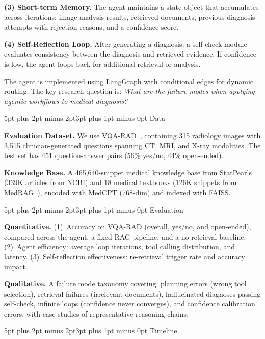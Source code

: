 \documentclass[10pt,twocolumn,letterpaper]{article}
\makeatletter
\renewcommand\section{\@startsection{section}{1}{\z@}%
  {5pt plus 2pt minus 2pt}{3pt plus 1pt minus 0pt}%
  {\large\bfseries}}
\makeatother
\begin{document}
\textbf{(3) Short-term Memory.} The agent maintains a state object that accumulates across iterations: image analysis results, retrieved documents, previous diagnosis attempts with rejection reasons, and a confidence score.

\textbf{(4) Self-Reflection Loop.} After generating a diagnosis, a self-check module evaluates consistency between the diagnosis and retrieved evidence. If confidence is low, the agent loops back for additional retrieval or analysis.

The agent is implemented using LangGraph with conditional edges for dynamic routing. The key research question is: \textit{What are the failure modes when applying agentic workflows to medical diagnosis?}

\section{Data}

\textbf{Evaluation Dataset.} We use VQA-RAD~\cite{lau2018dataset}, containing 315 radiology images with 3,515 clinician-generated questions spanning CT, MRI, and X-ray modalities. The test set has 451 question-answer pairs (56\% yes/no, 44\% open-ended).

\textbf{Knowledge Base.} A 465,640-snippet medical knowledge base from StatPearls (339K articles from NCBI) and 18 medical textbooks (126K snippets from MedRAG~\cite{xiong2024benchmarking}), encoded with MedCPT (768-dim) and indexed with FAISS.

\section{Evaluation}

\textbf{Quantitative.} (1)~Accuracy on VQA-RAD (overall, yes/no, and open-ended), compared across the agent, a fixed RAG pipeline, and a no-retrieval baseline. (2)~Agent efficiency: average loop iterations, tool calling distribution, and latency. (3)~Self-reflection effectiveness: re-retrieval trigger rate and accuracy impact.

\textbf{Qualitative.} A failure mode taxonomy covering: planning errors (wrong tool selection), retrieval failures (irrelevant documents), hallucinated diagnoses passing self-check, infinite loops (confidence never converges), and confidence calibration errors, with case studies of representative reasoning chains.

\section{Timeline}
\end{document}
